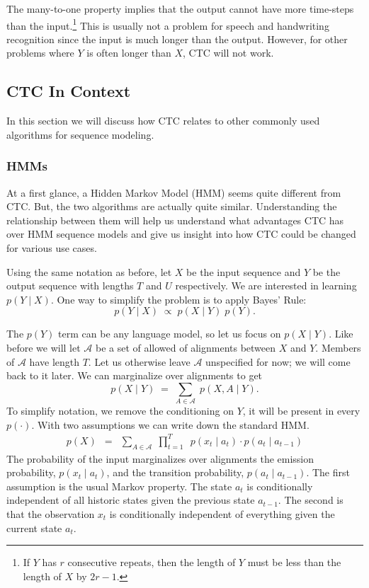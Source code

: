 The many-to-one property implies that the output cannot have more time-steps
than the input.\footnote{If $Y$ has $r$ consecutive repeats, then the length of
$Y$ must be less than the length of $X$ by $2r - 1$.} This is usually not a
problem for speech and handwriting recognition since the input is much longer
than the output. However, for other problems where $Y$ is often longer than
$X$, CTC will not work.

\subsection{CTC In Context}

In this section we will discuss how CTC relates to other commonly used
algorithms for sequence modeling.

\subsubsection{HMMs}

At a first glance, a Hidden Markov Model (HMM) seems quite different from
CTC. But, the two algorithms are actually quite similar. Understanding the
relationship between them will help us understand what advantages CTC has over
HMM sequence models and give us insight into how CTC could be changed for
various use cases.

Using the same notation as before, let $X$ be the input sequence and $Y$ be the
output sequence with lengths $T$ and $U$ respectively. We are interested in
learning $p(Y \mid X)$. One way to simplify the problem is to apply Bayes'
Rule:
\[
p(Y \mid X) \; \propto \; p(X \mid Y) \; p(Y).
\]

The $p(Y)$ term can be any language model, so let us focus on $p(X \mid Y)$.
Like before we will let $\mathcal{A}$ be a set of allowed of alignments between
$X$ and $Y$. Members of $\mathcal{A}$ have length $T$. Let us otherwise leave
$\mathcal{A}$ unspecified for now; we will come back to it later. We can
marginalize over alignments to get
\[
p(X \mid Y)\; = \; \sum_{A \in \mathcal{A}} \; p(X, A \mid Y).
\]
To simplify notation, we remove the conditioning on $Y$, it will be present in
every $p(\cdot)$. With two assumptions we can write down the standard HMM.
\begin{align*}
p(X) \enspace = \enspace \sum_{A \in \mathcal{A}} \; \prod_{t=1}^T \enspace
                p(x_t \mid a_t) \cdot p(a_t \mid a_{t-1})
\end{align*}
The probability of the input marginalizes over alignments the emission
probability, $p(x_t \mid a_t)$, and the transition probability, $p(a_t \mid
a_{t-1})$. The first assumption is the usual Markov property. The state $a_t$
is conditionally independent of all historic states given the previous state
$a_{t-1}$. The second is that the observation $x_t$ is conditionally
independent of everything given the current state $a_t$.

